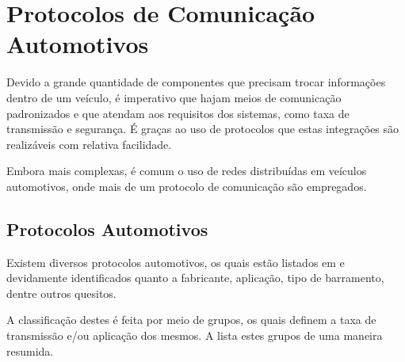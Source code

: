\section{Protocolos de Comunicação Automotivos}

Devido a grande quantidade de componentes que precisam trocar informações dentro de um veículo, é imperativo que hajam meios de comunicação padronizados e que atendam aos requisitos dos sistemas, como taxa de transmissão e segurança. É graças ao uso de protocolos que estas integrações são realizáveis com relativa facilidade.

Embora mais complexas, é comum o uso de redes distribuídas em veículos automotivos, onde mais de um protocolo de comunicação são empregados.


\subsection{Protocolos Automotivos}

Existem diversos protocolos automotivos, os quais estão listados em  e devidamente identificados quanto a fabricante, aplicação, tipo de barramento, dentre outros quesitos.

A classificação destes é feita por meio de grupos, os quais definem a taxa de transmissão e/ou aplicação dos mesmos. A  lista estes grupos de uma maneira resumida.

